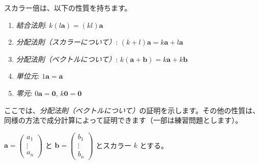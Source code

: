 \begin{thm}[スカラー倍の性質]
スカラー倍は、以下の性質を持ちます。
\begin{enumerate}
\item \emph{結合法則}: $k(l\bm{a}) = (kl)\bm{a}$
\item \emph{分配法則（スカラーについて）}: $(k+l)\bm{a} = k\bm{a} + l\bm{a}$
\item \emph{分配法則（ベクトルについて）}: $k(\bm{a}+\bm{b}) = k\bm{a} + k\bm{b}$
\item \emph{単位元}: $1\bm{a} = \bm{a}$
\item \emph{零元}: $0\bm{a} = \bm{0}$, $k\bm{0} = \bm{0}$
\end{enumerate}
\begin{proof*}
ここでは、\emph{分配法則（ベクトルについて）}の証明を示します。その他の性質は、同様の方法で成分計算によって証明できます（一部は練習問題とします）。\par
$\bm{a} = \begin{pmatrix} a_1 \\ \vdots \\ a_n \end{pmatrix}$ と $\bm{b} = \begin{pmatrix} b_1 \\ \vdots \\ b_n \end{pmatrix}$ とスカラー $k$ とする。

\end{proof*}
\end{thm}
